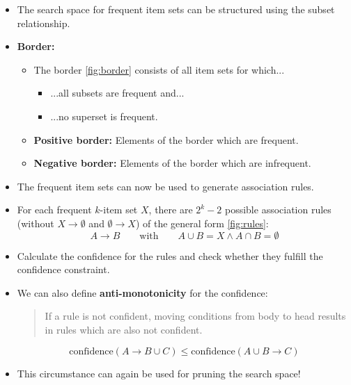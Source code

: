 \begin{frame}
	\begin{itemize}
		\item The search space for frequent item sets can be structured using the subset relationship.
		\item \textbf{Border:}
		\begin{itemize}
			\item The border \cref{fig:border} consists of all item sets for which...
			\begin{itemize}
				\item ...all subsets are frequent and...
				\item ...no superset is frequent.
			\end{itemize}
			\item \textbf{Positive border:} Elements of the border which are frequent.
			\item \textbf{Negative border:} Elements of the border which are infrequent.
		\end{itemize}
	\end{itemize}
	
\end{frame}


\begin{frame}
\end{frame}


\begin{frame}
	\begin{itemize}
		\item The frequent item sets can now be used to generate association rules.
		\item For each frequent $k$-item set $X$, there are $2^k - 2$ possible association rules (without $X \rightarrow \emptyset$ and $\emptyset \rightarrow X$) of the general form \cref{fig:rules}:
		\begin{equation}
			A \rightarrow B \qquad\text{with}\qquad A \cup B = X \wedge A \cap B = \emptyset 
		\end{equation}
		\item Calculate the confidence for the rules and check whether they fulfill the confidence constraint.
		\item We can also define \textbf{anti-monotonicity} for the confidence:
		\begin{quote}
			If a rule is not confident, moving conditions from body to head results in rules which are also not confident.
		\end{quote}
		\begin{equation}
			\text{confidence}(A \rightarrow B \cup C) \le \text{confidence}(A \cup B \rightarrow C)
		\end{equation}
		\item This circumstance can again be used for pruning the search space!
	\end{itemize}
\end{frame}


